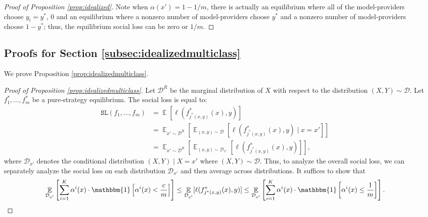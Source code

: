 \documentclass[letterpaper,11pt]{article}
\theoremstyle{plain}
\DeclareMathOperator*{\E}{\mathbb{E}}
\begin{document}
\begin{proof}[Proof of Proposition \ref{prop:idealized}]
Note when $\alpha(x') = 1 - 1/m$, there is actually an equilibrium where all of the model-providers choose $y_i = y^*$, $0$ and an equilibrium where a nonzero number of model-providers choose $y^*$ and a nonzero number of model-providers choose $1-y^*$; thus, the equilibrium social loss can be zero or $1/m$. 


\end{proof}

\subsection{Proofs for Section \ref{subsec:idealizedmulticlass}}\label{appendix:multiclass}

We prove Proposition \ref{prop:idealizedmulticlass}.
\begin{proof}[Proof of Proposition \ref{prop:idealizedmulticlass}]

Let $\mathcal{D}^R$ be the marginal distribution of $X$ with respect to the distribution $(X,Y) \sim \mathcal{D}$. Let $f^*_1, \ldots, f^*_m$ be a pure-strategy equilibrium. The social loss is equal to:
\begin{align*}
 \texttt{SL}(f_1, \ldots, f_m) &= \E[\ell(f^*_{j^*(x,y)}(x), y)] \\
 &= \E_{x' \sim \mathcal{D}^R} \left[\E_{(x,y) \sim \mathcal{D}}[\ell(f^*_{j^*(x,y)}(x), y) \mid x = x']\right] \\
 &= \E_{x' \sim \mathcal{D}^R} \left[ \E_{(x,y) \sim \mathcal{D}_{x'}}[\ell(f^*_{j^*(x,y)}(x), y)]\right], 
\end{align*}
where $\mathcal{D}_{x'}$ denotes the conditional distribution $(X,Y) \mid X = x'$ where $(X,Y) \sim \mathcal{D}$. Thus, to analyze the overall social loss, we can separately analyze the social loss on each distribution $\mathcal{D}_{x'}$ and then average across distributions. It suffices to show that 
\[\E_{\mathcal{D}_{x'}} \left[\sum_{i=1}^K \alpha^i(x) \cdot \mathbbm{1}\left[\alpha^i(x) < \frac{c}{m}\right] \right] \le \E_{\mathcal{D}_{x'}}[\ell(f^*_{j^*(x,y)}(x), y)] \le  \E_{\mathcal{D}_{x'}} \left[\sum_{i=1}^K \alpha^i(x) \cdot \mathbbm{1}\left[\alpha^i(x) \le \frac{1}{m} \right] \right]. \]


\end{proof}
\end{document}
